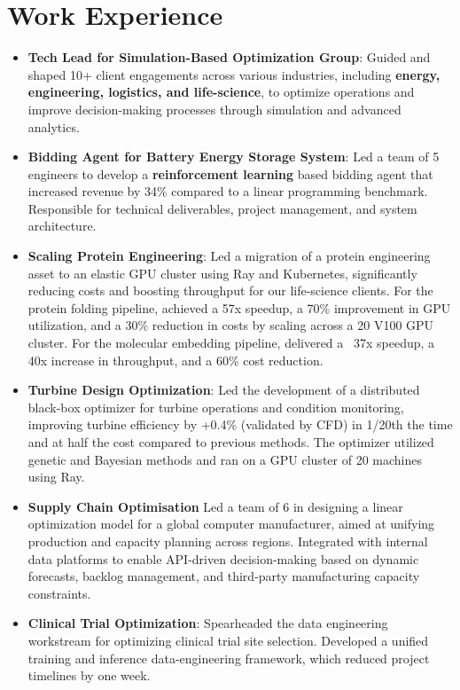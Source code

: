 \documentclass[a4paper]{deedy-resume} %
\begin{document}
\section{Work Experience}
\begin{itemize}
    \item \textbf{Tech Lead for Simulation-Based Optimization Group}: Guided and shaped 10+ client engagements across various industries, 
    including \textbf{energy, engineering, logistics, and life-science}, to optimize operations and improve decision-making processes through simulation and advanced analytics.
    \item \textbf{Bidding Agent for Battery Energy Storage System}: Led a team of 5 engineers to develop a \textbf{reinforcement learning} based bidding agent that 
    increased revenue by 34\% compared to a linear programming benchmark. Responsible for technical deliverables, project management, and system architecture.
    \item \textbf{Scaling Protein Engineering}: Led a migration of a protein engineering asset to an elastic GPU cluster using Ray and Kubernetes, significantly reducing costs 
    and boosting throughput for our life-science clients. For the protein folding pipeline, achieved a 57x speedup, a 70\% improvement in GPU utilization, 
    and a 30\% reduction in costs by scaling across a 20 V100 GPU cluster. For the molecular embedding pipeline, delivered a ~37x speedup, a 40x increase in throughput, 
    and a 60\% cost reduction.
    \item \textbf{Turbine Design Optimization}: Led the development of a distributed black-box optimizer for turbine operations and condition monitoring, 
    improving turbine efficiency by +0.4\% (validated by CFD) in 1/20th the time and at half the cost compared to previous methods. 
    The optimizer utilized genetic and Bayesian methods and ran on a GPU cluster of 20 machines using Ray.
    \item \textbf{Supply Chain Optimisation} Led a team of 6 in designing a linear optimization model for a global computer manufacturer, 
    aimed at unifying production and capacity planning across regions. Integrated with internal data platforms to enable API-driven decision-making 
    based on dynamic forecasts, backlog management, and third-party manufacturing capacity constraints.
    \item \textbf{Clinical Trial Optimization}: Spearheaded the data engineering workstream for optimizing clinical trial site selection. 
    Developed a unified training and inference data-engineering framework, which reduced project timelines by one week.
\end{itemize} 
\end{document}
